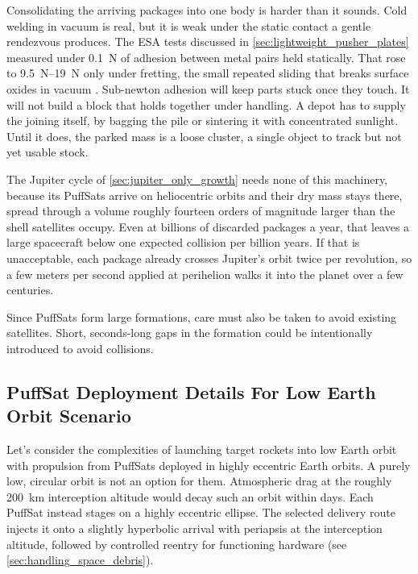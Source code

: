 \documentclass{article}
\begin{document}
Consolidating the arriving packages into one body is harder than it sounds. Cold welding in vacuum is real, but it is weak under the static contact a gentle rendezvous produces. The ESA tests discussed in \autoref{sec:lightweight_pusher_plates} measured under \SI{0.1}{\newton} of adhesion between metal pairs held statically. That rose to \SIrange[range-phrase={--},range-units=single]{9.5}{19}{\newton} only under fretting, the small repeated sliding that breaks surface oxides in vacuum \cite{merstallinger_cold_welding}. Sub-newton adhesion will keep parts stuck once they touch. It will not build a block that holds together under handling. A depot has to supply the joining itself, by bagging the pile or sintering it with concentrated sunlight. Until it does, the parked mass is a loose cluster, a single object to track but not yet usable stock.

The Jupiter cycle of \autoref{sec:jupiter_only_growth} needs none of this machinery, because its PuffSats arrive on heliocentric orbits and their dry mass stays there, spread through a volume roughly fourteen orders of magnitude larger than the shell satellites occupy. Even at billions of discarded packages a year, that leaves a large spacecraft below one expected collision per billion years. If that is unacceptable, each package already crosses Jupiter's orbit twice per revolution, so a few meters per second applied at perihelion walks it into the planet over a few centuries.

Since PuffSats form large formations, care must also be taken to avoid existing satellites. Short, seconds-long gaps in the formation could be intentionally introduced to avoid collisions.

\subsection{PuffSat Deployment Details For Low Earth Orbit Scenario}\label{sec:leo_orbit_details}
Let's consider the complexities of launching target rockets into low Earth orbit with propulsion from PuffSats deployed in highly eccentric Earth orbits. A purely low, circular orbit is not an option for them. Atmospheric drag at the roughly \SI{200}{\kilo\meter} interception altitude would decay such an orbit within days. Each PuffSat instead stages on a highly eccentric ellipse. The selected delivery route injects it onto a slightly hyperbolic arrival with periapsis at the interception altitude, followed by controlled reentry for functioning hardware (see \autoref{sec:handling_space_debris}).
\end{document}
